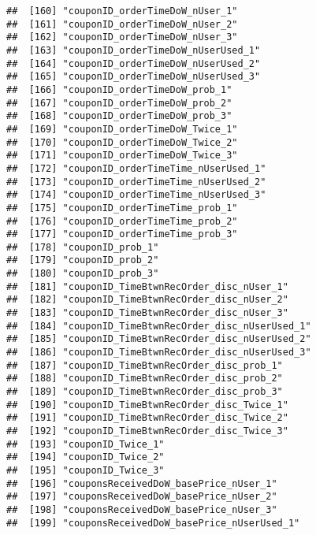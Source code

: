 \documentclass[10pt]{report}
\begin{document}
\begin{verbatim}
##  [160] "couponID_orderTimeDoW_nUser_1"                        
##  [161] "couponID_orderTimeDoW_nUser_2"                        
##  [162] "couponID_orderTimeDoW_nUser_3"                        
##  [163] "couponID_orderTimeDoW_nUserUsed_1"                    
##  [164] "couponID_orderTimeDoW_nUserUsed_2"                    
##  [165] "couponID_orderTimeDoW_nUserUsed_3"                    
##  [166] "couponID_orderTimeDoW_prob_1"                         
##  [167] "couponID_orderTimeDoW_prob_2"                         
##  [168] "couponID_orderTimeDoW_prob_3"                         
##  [169] "couponID_orderTimeDoW_Twice_1"                        
##  [170] "couponID_orderTimeDoW_Twice_2"                        
##  [171] "couponID_orderTimeDoW_Twice_3"                        
##  [172] "couponID_orderTimeTime_nUserUsed_1"                   
##  [173] "couponID_orderTimeTime_nUserUsed_2"                   
##  [174] "couponID_orderTimeTime_nUserUsed_3"                   
##  [175] "couponID_orderTimeTime_prob_1"                        
##  [176] "couponID_orderTimeTime_prob_2"                        
##  [177] "couponID_orderTimeTime_prob_3"                        
##  [178] "couponID_prob_1"                                      
##  [179] "couponID_prob_2"                                      
##  [180] "couponID_prob_3"                                      
##  [181] "couponID_TimeBtwnRecOrder_disc_nUser_1"               
##  [182] "couponID_TimeBtwnRecOrder_disc_nUser_2"               
##  [183] "couponID_TimeBtwnRecOrder_disc_nUser_3"               
##  [184] "couponID_TimeBtwnRecOrder_disc_nUserUsed_1"           
##  [185] "couponID_TimeBtwnRecOrder_disc_nUserUsed_2"           
##  [186] "couponID_TimeBtwnRecOrder_disc_nUserUsed_3"           
##  [187] "couponID_TimeBtwnRecOrder_disc_prob_1"                
##  [188] "couponID_TimeBtwnRecOrder_disc_prob_2"                
##  [189] "couponID_TimeBtwnRecOrder_disc_prob_3"                
##  [190] "couponID_TimeBtwnRecOrder_disc_Twice_1"               
##  [191] "couponID_TimeBtwnRecOrder_disc_Twice_2"               
##  [192] "couponID_TimeBtwnRecOrder_disc_Twice_3"               
##  [193] "couponID_Twice_1"                                     
##  [194] "couponID_Twice_2"                                     
##  [195] "couponID_Twice_3"                                     
##  [196] "couponsReceivedDoW_basePrice_nUser_1"                 
##  [197] "couponsReceivedDoW_basePrice_nUser_2"                 
##  [198] "couponsReceivedDoW_basePrice_nUser_3"                 
##  [199] "couponsReceivedDoW_basePrice_nUserUsed_1"             

\end{verbatim}
\end{document}
